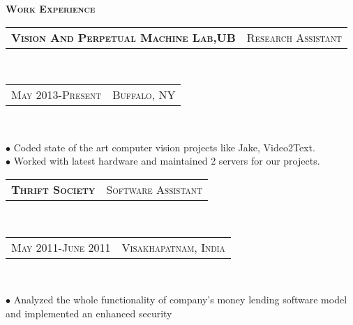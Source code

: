 \documentclass[10pt,letterpaper,oneside]{article}
\begin{document}
    \begin{minipage}[t]{0.63\textwidth}
        \vspace{0pt}
        \textcolor{light-gray}{\textbf{\large W\textsc{ork} E\textsc{xperience}}}
        \vspace{10pt}\\
        \begin{tabular}{c|c}
            \textbf{\normalsize V\textsc{ision} A\textsc{nd} P\textsc{erpetual} M\textsc{achine} L\textsc{ab},UB}
            &\textmd{\normalsize R\textsc{esearch} A\textsc{ssistant}}
        \end{tabular}\\
        \textcolor{light-gray}{
            \begin{tabular}{c|c}
                {\small M\textsc{ay 2013}-P\textsc{resent}}
               &{\small B\textsc{uffalo}, NY}
            \end{tabular}
        }\\ 
        \vspace{-4mm}
        \begin{adjustwidth}{7pt}{0pt}
            {\footnotesize $\bullet$ Coded state of the art computer vision projects like Jake, Video2Text.\\
            $\bullet$ Worked with latest hardware and maintained 2 servers for our projects. }\\
        \end{adjustwidth}
        \begin{tabular}{c|c}
            \textbf{\normalsize T\textsc{hrift} S\textsc{ociety}}
            &\textmd{\normalsize S\textsc{oftware} A\textsc{ssistant}}
        \end{tabular}\\
        \textcolor{light-gray}{
            \begin{tabular}{c|c}
                {\small M\textsc{ay 2011}-J\textsc{une 2011}}
                &{\small V\textsc{isakhapatnam}, I\textsc{ndia}}
            \end{tabular}
        }\\ 
        \vspace{-4mm}
        \begin{adjustwidth}{7pt}{0pt}
            {\footnotesize $\bullet$ Analyzed the whole functionality of company's money lending software model and implemented an enhanced security
}
\end{adjustwidth}
\end{minipage}
\end{document}
